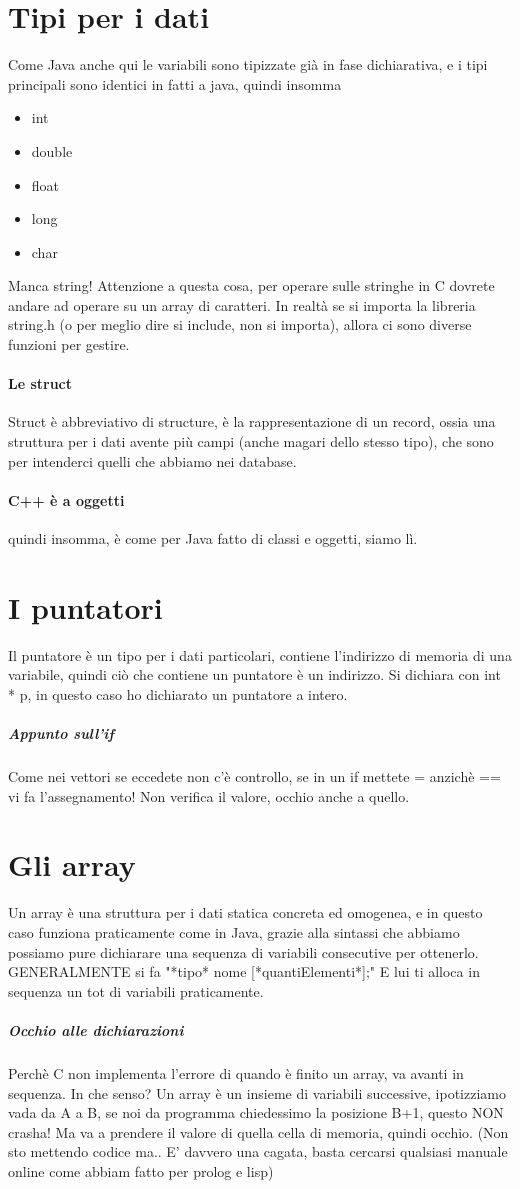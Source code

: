 \documentclass[12pt, a4paper, openany, oneside]{book}
\begin{document}
\section{Tipi per i dati}
Come Java anche qui le variabili sono tipizzate già in fase dichiarativa, e  i 
tipi principali sono identici in fatti a java, quindi insomma
\begin{itemize}
	\item int
	\item double
	\item float
	\item long
	\item char
\end{itemize}
Manca string! Attenzione a questa cosa, per operare sulle stringhe in C dovrete 
andare ad operare su un array di caratteri. In realtà se si importa la libreria
string.h (o per meglio dire si include, non si importa), allora ci sono diverse
funzioni per gestire.	
\paragraph{Le struct}
Struct è abbreviativo di structure, è la rappresentazione di un record, ossia
una struttura per i dati avente più campi (anche magari dello stesso tipo), 
che sono per intenderci quelli che abbiamo nei database. 
\paragraph{C++ è a oggetti} quindi insomma, è come per Java fatto di classi e
oggetti, siamo lì. 
\section{I puntatori}
Il puntatore è un tipo per i dati particolari, contiene l'indirizzo di memoria
di una variabile, quindi ciò che contiene un puntatore è un indirizzo. Si dichiara
con int * p, in questo caso ho dichiarato un puntatore a intero. 
\subparagraph{Appunto sull'if}
Come nei vettori se eccedete non c'è controllo, se in un if mettete = anzichè 
== vi fa l'assegnamento! Non verifica il valore, occhio anche a quello. 
\section{Gli array}
Un array è una struttura per i dati statica concreta ed omogenea, e in questo
caso funziona praticamente come in Java, grazie alla sintassi che abbiamo possiamo
pure dichiarare una sequenza di variabili consecutive per ottenerlo. 
\\ GENERALMENTE
si fa "*tipo* nome [*quantiElementi*];" E lui ti alloca in sequenza un tot di
variabili praticamente.
\subparagraph{Occhio alle dichiarazioni}
Perchè C non implementa l'errore di quando è finito un array, va avanti in 
sequenza. In che senso? Un array è un insieme di variabili successive, ipotizziamo 
vada da A a B, se noi da programma chiedessimo la posizione B+1, questo NON 
crasha! Ma va a prendere il valore di quella cella di memoria, quindi occhio.  
(Non sto mettendo codice ma.. E' davvero una cagata, basta cercarsi qualsiasi
manuale online come abbiam fatto per prolog e lisp)
\end{document}
